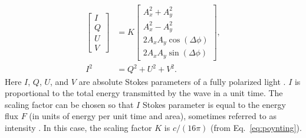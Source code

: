 \begin{align}
    \label{eq:stokes_abs}
    \begin{bmatrix}
        I\\Q\\U\\V
    \end{bmatrix} & = K
    \begin{bmatrix}
        A_x ^ 2 + A_y ^ 2 \\
        A_x ^ 2 - A_y ^ 2 \\
        2 A_x A_y \cos(\Delta \phi)\\
        2 A_x A_y \sin(\Delta \phi)
    \end{bmatrix},\\
    I^2 & = Q^2 + U^2 + V^2.
\end{align}
Here $I$, $Q$, $U$, and $V$ are absolute Stokes parameters of a fully polarized light \citep{Stokes1851}.
    $I$ is proportional to the total energy transmitted by the wave in a unit time.
    The scaling factor can be chosen so that $I$ Stokes parameter is equal to the energy flux $F$ (in units of energy per unit time and area), sometimes referred to as intensity \citep{PolarizationInCosmicMedium}.
    In this case, the scaling factor $K$ is $c/(16\pi)$ (from Eq.~\ref{eq:poynting}). 

